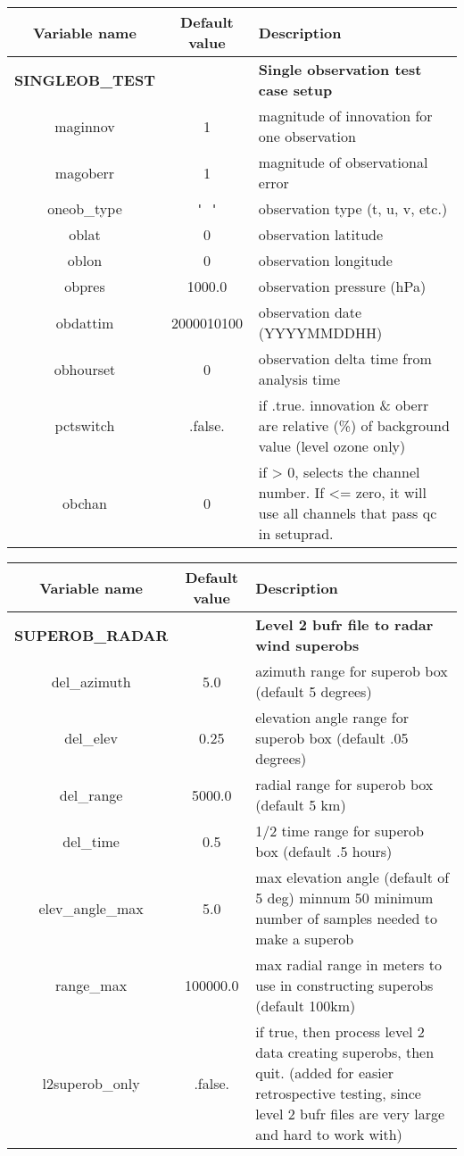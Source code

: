 \begin{table}[h]
 \footnotesize
 \center
 \begin{tabular}{| c | c | p{9cm} |}
 \hline
 Variable name & Default value & Description \\
 \hline
 \textbf{SINGLEOB\_TEST} & &  \textbf{Single observation test case setup} \\
 \hline
 maginnov & 1 & magnitude of innovation for one observation \\
 \hline
 magoberr & 1 & magnitude of observational error \\
 \hline
 oneob\_type & \verb|' '| & observation type (t, u, v, etc.) \\
 \hline
 oblat & 0 & observation latitude \\
 \hline
 oblon & 0 & observation longitude \\
 \hline
 obpres & 1000.0 & observation pressure (hPa) \\
 \hline
 obdattim & 2000010100 & observation date (YYYYMMDDHH) \\
 \hline
 obhourset & 0 & observation delta time from analysis time \\
 \hline
 pctswitch & .false. & if .true. innovation \& oberr are relative (\%) of background value (level ozone only) \\
 \hline
 obchan & 0 & if > 0, selects the channel number.  If <= zero, it will use all channels that pass qc in setuprad. \\
 \hline
 \end{tabular}
\end{table}

\begin{table}[h]
 \footnotesize
 \center
 \begin{tabular}{| c | c | p{9cm} |}
 \hline
 Variable name & Default value & Description \\
 \hline
\textbf{SUPEROB\_RADAR} & &  \textbf{Level 2 bufr file to radar wind superobs} \\
 \hline
 del\_azimuth & 5.0 & azimuth range for superob box  (default 5 degrees) \\
 \hline
 del\_elev & 0.25 & elevation angle range for superob box  (default .05 degrees) \\
 \hline
 del\_range & 5000.0 & radial range for superob box  (default 5 km) \\
 \hline
 del\_time & 0.5 & 1/2 time range for superob box  (default .5 hours) \\
 \hline
 elev\_angle\_max & 5.0 & max elevation angle (default of 5 deg) minnum	50	minimum number of samples needed to make a superob \\
 \hline
 range\_max & 100000.0 & max radial range in meters to use in constructing superobs  (default 100km) \\
 \hline
 l2superob\_only & .false. & if true, then process level 2 data creating superobs, then quit. (added for easier retrospective testing, since level 2 bufr files are very large and hard to work with) \\
 \hline
 \end{tabular}
\end{table}

